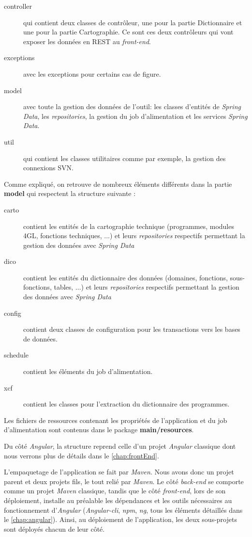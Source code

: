 \documentclass{polytech/polytech}
\begin{document}
\begin{description}
	\item[controller] qui contient deux classes de contrôleur, une pour la partie Dictionnaire et une pour la partie Cartographie. Ce sont ces deux contrôleurs qui vont exposer les données en REST au \textit{front-end}. 
	\item[exceptions] avec les exceptions pour certains cas de figure.
	\item[model] avec toute la gestion des données de l'outil: les classes d'entités de \textit{Spring Data}, les \textit{repositories}, la gestion du job d'alimentation et les services \textit{Spring Data}.
	\item[util] qui contient les classes utilitaires comme par exemple, la gestion des connexions SVN.
\end{description}

Comme expliqué, on retrouve de nombreux éléments différents dans la partie \textbf{model} qui respectent la structure suivante : 

\begin{description}
	\item[carto] contient les entités de la cartographie technique (programmes, modules 4GL, fonctions techniques, ...) et leurs \textit{repositories} respectifs permettant la gestion des données avec \textit{Spring Data}
	\item[dico] contient les entités du dictionnaire des données (domaines, fonctions, sous-fonctions, tables, ...) et leurs \textit{repositories} respectifs permettant la gestion des données avec \textit{Spring Data}
	\item[config] contient deux classes de configuration pour les transactions vers les bases de données.
	\item[schedule] contient les éléments du job d'alimentation.
	\item[xcf] contient les classes pour l'extraction du dictionnaire des programmes.
\end{description}

Les fichiers de ressources contenant les propriétés de l'application et du job d'alimentation sont contenus dans le package \textbf{main/resources}.

Du côté \textit{Angular}, la structure reprend celle d'un projet \textit{Angular} classique dont nous verrons plus de détails dans le \autoref{chap:frontEnd}.

L'empaquetage de l'application se fait par \textit{Maven}. Nous avons donc un projet parent et deux projets fils, le tout relié par \textit{Maven}. Le côté \textit{back-end} se comporte comme un projet \textit{Maven} classique, tandis que le côté \textit{front-end}, lors de son déploiement, installe au préalable les dépendances et les outils nécessaires au fonctionnement d'\textit{Angular} (\textit{Angular-cli}, \textit{npm}, \textit{ng}, tous les éléments détaillés dans le \autoref{chap:angular}). Ainsi, au déploiement de l'application, les deux sous-projets sont déployés chacun de leur côté. 
\end{document}
